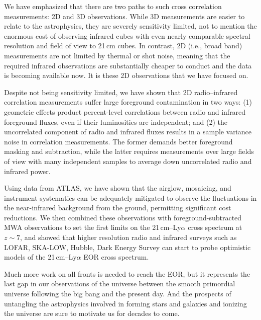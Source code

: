 We have emphasized that there are two paths to such cross correlation measurements: 2D and 3D observations. While 3D measurements are easier to relate to the astrophysics, they are severely sensitivity limited, not to mention the enormous cost of observing infrared cubes with even nearly comparable spectral resolution and field of view to 21\,cm cubes. In contrast, 2D (i.e., broad band) measurements are not limited by thermal or shot noise, meaning that the required infrared observations are substantially cheaper to conduct and the data is becoming available now. It is these 2D observations that we have focused on.


Despite not being sensitivity limited, we have shown that 2D radio--infrared correlation measurements suffer large foreground contamination in two ways: (1) geometric effects product percent-level correlations between radio and infrared foreground fluxes, even if their luminosities are independent; and (2) the uncorrelated component of radio and infrared fluxes results in a sample variance noise in correlation measurements. The former demands better foreground masking and subtraction, while the latter requires measurements over large fields of view with many independent samples to average down uncorrelated radio and infrared power.

Using data from ATLAS, we have shown that the airglow, mosaicing, and instrument systematics can be adequately mitigated to observe the fluctuations in the near-infrared background from the ground, permitting significant cost reductions. We then combined these observations with foreground-subtracted MWA observations to set the first limits on the 21\,cm--Ly$\alpha$ cross spectrum at $z\sim7$, and showed that higher resolution radio and infrared surveys such as LOFAR, SKA-LOW, Hubble, Dark Energy Survey can start to probe optimistic models of the 21\,cm--Ly$\alpha$ EOR cross spectrum.

Much more work on all fronts is needed to reach the EOR, but it represents the last gap in our observations of the universe between the smooth primordial universe following the big bang and the present day. And the prospects of untangling the astrophysics involved in forming stars and galaxies and ionizing the universe are sure to motivate us for decades to come.


